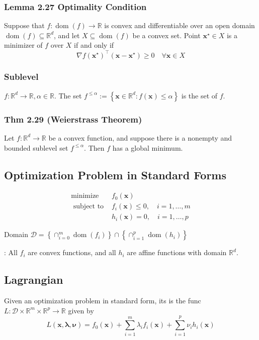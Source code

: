 \subsubsection*{Lemma 2.27 Optimality Condition}
Suppose that $f: \operatorname{dom}(f) \rightarrow \mathbb{R}$ is convex and differentiable over an open domain $\operatorname{dom}(f) \subseteq \mathbb{R}^{d}$, and let $X \subseteq \operatorname{dom}(f)$ be a convex set. Point $\mathbf{x}^{\star} \in X$ is a minimizer of $f$ over $X$ if and only if
$$
\nabla f\left(\mathbf{x}^{\star}\right)^{\top}\left(\mathbf{x}-\mathbf{x}^{\star}\right) \geq 0 \quad \forall \mathbf{x} \in X
$$

\subsubsection*{Sublevel}
$f: \mathbb{R}^{d} \rightarrow \mathbb{R}, \alpha \in \mathbb{R}$. The set $f^{\leq \alpha}:=\left\{\mathbf{x} \in \mathbb{R}^{d}: f(\mathbf{x}) \leq \alpha\right\}$ is the  set of $f$.

\subsubsection*{Thm 2.29 (Weierstrass Theorem)}
Let $f: \mathbb{R}^{d} \rightarrow \mathbb{R}$ be a convex function, and suppose there is a nonempty and bounded sublevel set $f^{\leq \alpha}$. Then $f$ has a global minimum.

\subsection*{Optimization Problem in Standard Forms}
$$
\begin{array}{ll}
\operatorname{minimize} & f_{0}(\mathbf{x}) \\
\text { subject to } & f_{i}(\mathbf{x}) \leq 0, \quad i=1, \ldots, m \\
& h_{i}(\mathbf{x})=0, \quad i=1, \ldots, p
\end{array}
$$

Domain
$
\mathcal{D}=\left\{\cap_{i=0}^{m} \operatorname{dom}\left(f_{i}\right)\right\} \cap \left\{ \cap_{i=1}^{p} \operatorname{dom}\left(h_{i}\right)\right\}
$

: All $f_{i}$ are convex functions, and all $h_{i}$ are affine functions with domain $\mathbb{R}^{d}$.

\subsection*{Lagrangian}
Given an optimization problem in standard form, its  is the func $L: \mathcal{D} \times \mathbb{R}^{m} \times \mathbb{R}^{p} \rightarrow \mathbb{R}$ given by
$$
L(\mathbf{x}, \boldsymbol{\lambda}, \boldsymbol{\nu})=f_{0}(\mathbf{x})+\sum_{i=1}^{m} \lambda_{i} f_{i}(\mathbf{x})+\sum_{i=1}^{p} \nu_{i} h_{i}(\mathbf{x})
$$


